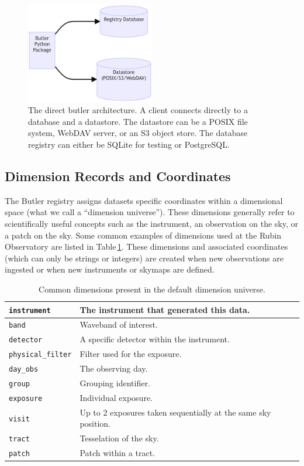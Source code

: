 \begin{figure}
\centering
\includegraphics[width=0.5\textwidth]{butler-direct}
\caption{The direct butler architecture. A client connects directly to a database and a datastore. The datastore can be a POSIX file system, WebDAV server, or an S3 object store. The database registry can either be SQLite for testing or PostgreSQL.\label{fig:direct}}
\end{figure}


\subsection{Dimension Records and Coordinates}

The Butler registry assigns datasets specific coordinates within a dimensional space (what we call a ``dimension universe'').
These dimensions generally refer to scientifically useful concepts such as the instrument, an observation on the sky, or a patch on the sky.
Some common examples of dimensions used at the Rubin Observatory are listed in Table\,\ref{tab:dimensions}.
These dimensions and associated coordinates (which can only be strings or integers) are created when new observations are ingested or when new instruments or skymaps are defined.

\begin{table}[ht]
\caption{Common dimensions present in the default dimension universe.}
\centering
\begin{tabular}{|l|l|}
\hline
\texttt{instrument} &  The instrument that generated this data. \\ \hline
\texttt{band} & Waveband of interest.  \\ \hline
\texttt{detector} & A specific detector within the instrument. \\ \hline
\texttt{physical\_filter} &  Filter used for the exposure. \\ \hline
\texttt{day\_obs} & The observing day. \\ \hline
\texttt{group} &  Grouping identifier. \\ \hline
\texttt{exposure} & Individual exposure. \\ \hline
\texttt{visit} &  Up to 2 exposures taken sequentially at the same sky position. \\ \hline
\texttt{tract} &  Tesselation of the sky. \\ \hline
\texttt{patch} &  Patch within a tract.\\ \hline
\end{tabular}
\label{tab:dimensions}
\end{table}

